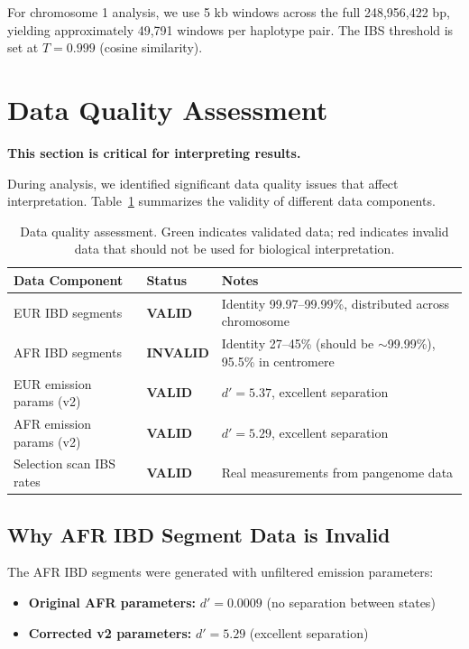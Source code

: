 \documentclass[11pt]{article}
\begin{document}
For chromosome 1 analysis, we use 5 kb windows across the full 248,956,422 bp, yielding approximately 49,791 windows per haplotype pair. The IBS threshold is set at $T = 0.999$ (cosine similarity).

\section{Data Quality Assessment}

\textbf{This section is critical for interpreting results.}

During analysis, we identified significant data quality issues that affect interpretation. Table~\ref{tab:quality} summarizes the validity of different data components.

\begin{table}[H]
\centering
\begin{tabular}{@{}llp{6cm}@{}}
\textbf{Data Component} & \textbf{Status} & \textbf{Notes} \\
\midrule
EUR IBD segments & \textcolor{validgreen}{\textbf{VALID}} & Identity 99.97--99.99\%, distributed across chromosome \\
AFR IBD segments & \textcolor{invalidred}{\textbf{INVALID}} & Identity 27--45\% (should be $\sim$99.99\%), 95.5\% in centromere \\
EUR emission params (v2) & \textcolor{validgreen}{\textbf{VALID}} & $d' = 5.37$, excellent separation \\
AFR emission params (v2) & \textcolor{validgreen}{\textbf{VALID}} & $d' = 5.29$, excellent separation \\
Selection scan IBS rates & \textcolor{validgreen}{\textbf{VALID}} & Real measurements from pangenome data \\
\end{tabular}
\caption{Data quality assessment. Green indicates validated data; red indicates invalid data that should not be used for biological interpretation.}
\label{tab:quality}
\end{table}

\subsection{Why AFR IBD Segment Data is Invalid}

The AFR IBD segments were generated with unfiltered emission parameters:
\begin{itemize}
\item \textbf{Original AFR parameters:} $d' = 0.0009$ (no separation between states)
\item \textbf{Corrected v2 parameters:} $d' = 5.29$ (excellent separation)
\end{itemize}
\end{document}

